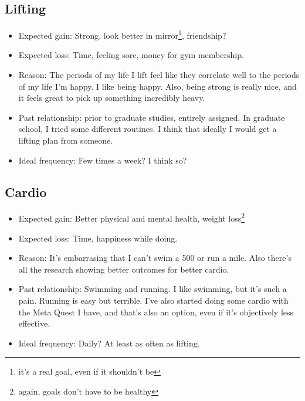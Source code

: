 \documentclass[12pt]{article}
\renewcommand{\,}{\textsuperscript{,}}
\begin{document}
\subsection{Lifting}
\begin{itemize}
    \item Expected gain: Strong, look better in mirror\footnote{it's a real goal, even if it shouldn't be}, friendship?
    \item Expected loss: Time, feeling sore, money for gym membership.
    \item Reason: The periods of my life I lift feel like they correlate well to the periods of my life I'm happy.
    I like being happy.
    Also, being strong is really nice, and it feels great to pick up something incredibly heavy.
    \item Past relationship: prior to graduate studies, entirely assigned. In graduate school, I tried some different routines.
    I think that ideally I would get a lifting plan from someone.
    \item Ideal frequency: Few times a week? I think so?
\end{itemize}

\subsection{Cardio}
\begin{itemize}
    \item Expected gain: Better physical and mental health, weight loss\footnote{again, goals don't have to be healthy}
    \item Expected loss: Time, happiness while doing.
    \item Reason: It's embarrasing that I can't swim a 500 or run a mile. Also there's all the research showing better outcomes for better cardio.
    \item Past relationship: Swimming and running. I like swimming, but it's such a pain. Running is easy but terrible. I've also started doing some cardio with the Meta Quest I have, and that's also an option, even if it's objectively less effective.
    \item Ideal frequency: Daily? At least as often as lifting.

\end{itemize}
\end{document}
